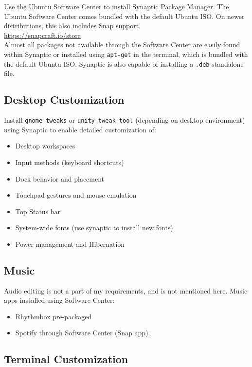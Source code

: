 \documentclass[8pt,letterpaper,twocolumn]{article}
\begin{document}
Use the Ubuntu Software Center to install Synaptic Package Manager. The Ubuntu Software Center comes bundled with the default Ubuntu ISO. On newer distributions, this also includes Snap support. \\

\url{https://snapcraft.io/store}\\

Almost all packages not available through the Software Center are easily found within Synaptic or installed using \texttt{apt-get} in the terminal, which is bundled with the default Ubuntu ISO. Synaptic is also capable of installing a \texttt{.deb} standalone file.

\subsection{Desktop Customization}
Install \texttt{gnome-tweaks} or \texttt{unity-tweak-tool} (depending on desktop environment) using Synaptic to enable detailed customization of:


\begin{itemize}
	\item Desktop workspaces 
	\item Input methods (keyboard shortcuts) 
	\item Dock behavior and placement
	\item Touchpad gestures and mouse emulation
	\item Top Status bar
	\item System-wide fonts (use synaptic to install new fonts) 
	\item Power management and Hibernation
\end{itemize}

\subsection{Music}

Audio editing is not a part of my requirements, and is not mentioned here.
Music apps installed using Software Center:

\begin{itemize}
	\item Rhythmbox pre-packaged
	\item Spotify through Software Center (Snap app).
\end{itemize}

\subsection{Terminal Customization}
\end{document}
